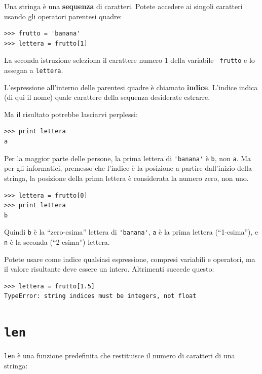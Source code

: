 \documentclass[10pt]{book}
\begin{document}
Una stringa è una {\bf sequenza} di caratteri. Potete accedere ai singoli caratteri usando gli operatori parentesi quadre:

\begin{verbatim}
>>> frutto = 'banana'
>>> lettera = frutto[1]
\end{verbatim}
%
La seconda istruzione seleziona il carattere numero 1 della variabile {\tt
frutto} e lo assegna a {\tt lettera}.  

L'espressione all'interno delle parentesi quadre è chiamato {\bf indice}.  
L'indice indica (di qui il nome) quale carattere della sequenza desiderate estrarre.

Ma il risultato potrebbe lasciarvi perplessi:

\begin{verbatim}
>>> print lettera
a
\end{verbatim}
%
Per la maggior parte delle persone, la prima lettera di \verb"'banana'" è {\tt b}, non
{\tt a}.  Ma per gli informatici, premesso che l'indice è la posizione a partire dall'inizio della stringa, la posizione della prima lettera è considerata la numero zero, non uno.

\begin{verbatim}
>>> lettera = frutto[0]
>>> print lettera
b
\end{verbatim}
%
Quindi {\tt b} è la ``zero-esima'' lettera di \verb"'banana'", {\tt a}
è la prima lettera (``1-esima''), e {\tt n} è la seconda (``2-esima'')
lettera.

Potete usare come indice qualsiasi espressione, compresi variabili e operatori, ma il valore risultante deve essere un intero. Altrimenti succede questo:

\begin{verbatim}
>>> lettera = frutto[1.5]
TypeError: string indices must be integers, not float
\end{verbatim}
%

\section{{\tt len}}

{\tt len} è una funzione predefinita che restituisce il numero di caratteri di una stringa:
\end{document}
